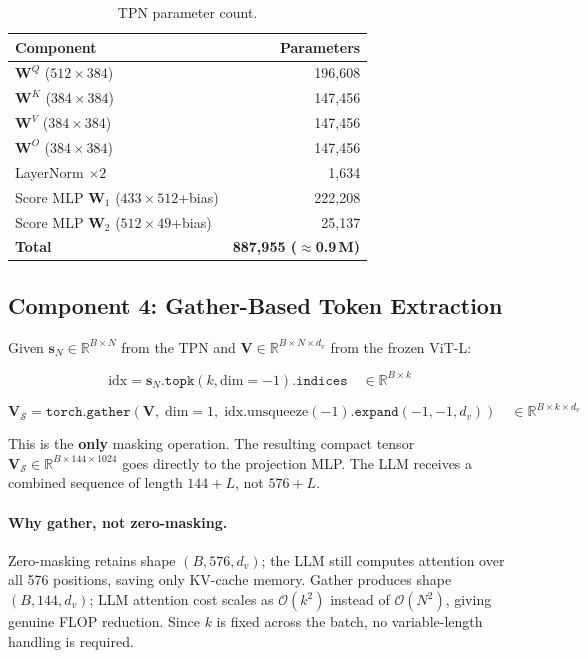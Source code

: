 \documentclass[11pt,a4paper]{article}
\newcommand{\R}{\mathbb{R}}
\newcommand{\vs}{\mathbf{s}}
\newcommand{\mV}{\mathbf{V}}
\begin{document}
\begin{table}[h]
\centering
\caption{TPN parameter count.}
\label{tab:tpn_params}
\renewcommand{\arraystretch}{1.15}
\small
\begin{tabular}{@{}lr@{}}
  \toprule
  Component & Parameters \\
  \midrule
  $\mathbf{W}^Q$ ($512 \times 384$)      & 196{,}608 \\
  $\mathbf{W}^K$ ($384 \times 384$)      & 147{,}456 \\
  $\mathbf{W}^V$ ($384 \times 384$)      & 147{,}456 \\
  $\mathbf{W}^O$ ($384 \times 384$)      & 147{,}456 \\
  LayerNorm $\times 2$                   & 1{,}634   \\
  Score MLP $\mathbf{W}_1$ ($433\times512$+bias) & 222{,}208 \\
  Score MLP $\mathbf{W}_2$ ($512\times49$+bias)  & 25{,}137  \\
  \midrule
  \textbf{Total} & \textbf{887{,}955 ($\approx$0.9\,M)} \\
  \bottomrule
\end{tabular}
\end{table}

\subsection{Component 4: Gather-Based Token Extraction}
\label{subsec:gather_component}

Given $\vs_N \in \R^{B \times N}$ from the TPN and
$\mV \in \R^{B \times N \times d_v}$ from the frozen ViT-L:

\begin{equation}
  \text{idx} = \vs_N.\texttt{topk}(k, \text{dim}{=}{-}1).\texttt{indices}
  \quad\in \R^{B \times k}
\end{equation}

\begin{equation}
  \mV_\mathcal{S} = \texttt{torch.gather}(\mV,\; \text{dim}{=}1,\;
  \text{idx.unsqueeze}({-}1)\texttt{.expand}({-}1,{-}1,d_v))
  \quad\in \R^{B \times k \times d_v}
\end{equation}

This is the \textbf{only} masking operation. The resulting compact tensor
$\mV_\mathcal{S} \in \R^{B \times 144 \times 1024}$ goes directly to the
projection MLP. The LLM receives a combined sequence of length $144{+}L$,
not $576{+}L$.

\paragraph{Why gather, not zero-masking.}
Zero-masking retains shape $(B, 576, d_v)$; the LLM still computes
attention over all 576 positions, saving only KV-cache memory.
Gather produces shape $(B, 144, d_v)$; LLM attention cost scales as
$\mathcal{O}(k^2)$ instead of $\mathcal{O}(N^2)$, giving genuine FLOP
reduction. Since $k$ is fixed across the batch, no variable-length
handling is required.
\end{document}
